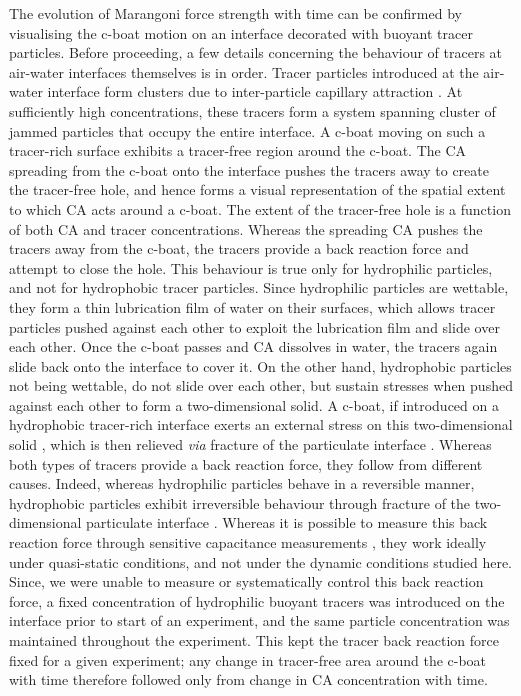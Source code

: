 \documentclass[journal=langd5, manuscript=article, layout=twocolumn]{achemso}
\begin{document}
The evolution of Marangoni force strength with time can be confirmed by visualising the c-boat motion on an interface decorated with buoyant tracer particles. Before proceeding, a few details concerning the behaviour of tracers at air-water interfaces themselves is in order. Tracer particles introduced at the air-water interface form clusters due to inter-particle capillary attraction \cite{Vella2005}. At sufficiently high concentrations, these tracers form a system spanning cluster of jammed particles that occupy the entire interface. A c-boat moving on such a tracer-rich surface exhibits a tracer-free region around the c-boat. The CA spreading from the c-boat onto the interface pushes the tracers away to create the tracer-free hole, and hence forms a visual representation of the spatial extent to which CA acts around a c-boat. The extent of the tracer-free hole is a function of both CA and tracer concentrations. Whereas the spreading CA pushes the tracers away from the c-boat, the tracers provide a back reaction force and attempt to close the hole. This behaviour is true only for hydrophilic particles, and not for hydrophobic tracer particles. Since hydrophilic particles are wettable, they form a thin lubrication film of water on their surfaces, which allows tracer particles pushed against each other to exploit the lubrication film and slide over each other. Once the c-boat passes and CA dissolves in water, the tracers again slide back onto the interface to cover it. On the other hand, hydrophobic particles not being wettable, do not slide over each other, but sustain stresses when pushed against each other to form a two-dimensional solid. A c-boat, if introduced on a hydrophobic tracer-rich interface exerts an external stress on this two-dimensional solid \cite{Vella2004, Vella2006, Mahadevan2011}, which is then relieved {\it via} fracture of the particulate interface \cite{Vella2006, Mahadevan2011}. Whereas both types of tracers provide a back reaction force, they follow from different causes. Indeed, whereas hydrophilic particles behave in a reversible manner, hydrophobic particles exhibit irreversible behaviour through fracture of the two-dimensional particulate interface \cite{Vella2006, Mahadevan2011}. Whereas it is possible to measure this back reaction force through sensitive capacitance measurements \cite{Varshney2012}, they work ideally under quasi-static conditions, and not under the dynamic conditions studied here. Since, we were unable to measure or systematically control this back reaction force, a fixed concentration of hydrophilic buoyant tracers was introduced on the interface prior to start of an experiment, and the same particle concentration was maintained throughout the experiment. This kept the tracer back reaction force fixed for a given experiment; any change in tracer-free area around the c-boat with time therefore followed only from change in CA concentration with time.
\end{document}
